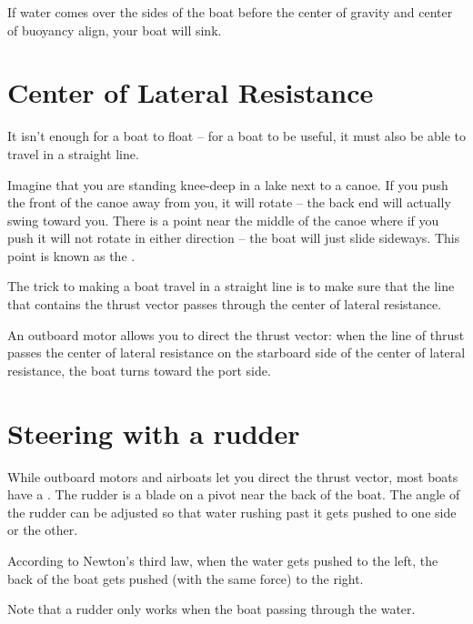 If water comes over the sides of the boat before the center of gravity and center of buoyancy align,  your boat will sink.

\section{Center of Lateral Resistance}

It isn't enough for a boat to float -- for a boat to be useful,  it must also be able to travel in a straight line.

Imagine that you are standing knee-deep in a lake next to a canoe.  If you push the front of the canoe away from you,  it will rotate -- the back end will actually
swing toward you.   There is a point near the middle of the canoe where if you push it will not rotate in either direction -- the boat will just slide sideways.  This point is known as the .

The trick to making a boat travel in a straight line is to make sure that the line that contains the thrust vector passes through the center of lateral resistance.

An outboard motor allows you to direct the thrust vector: when the line of thrust passes the center of lateral resistance on the starboard side of the center of lateral resistance,  the boat turns toward the port side.

\section{Steering with a rudder}
 
While outboard motors and airboats let you direct the thrust vector,  most boats have a .  The rudder is a blade on a pivot near the back of 
the boat.   The angle of the rudder can be adjusted so that water rushing past it gets pushed to one side or the other.

According to Newton's third law,  when the water gets pushed to the left,  the back of the boat gets pushed (with the same force) to the right.

Note that a rudder only works when the boat passing through the water. 




